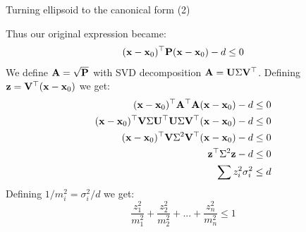 \documentclass{beamer}
\begin{document}
\begin{frame}{Turning ellipsoid to the canonical form (2)}
	\begin{flushleft}
		
		Thus our original expression became:
		\begin{align}
			(\mathbf{x} - \mathbf{x}_0)^\top \mathbf{P}(\mathbf{x} - \mathbf{x}_0) - d \leq 0
		\end{align}
		We define $\mathbf{A} = \sqrt{\mathbf{P}}$ with SVD decomposition $\mathbf{A} = \mathbf{U} \Sigma \mathbf{V}^\top$. Defining $\mathbf{z} = \mathbf{V}^\top (\mathbf{x} - \mathbf{x}_0)$ we get:
		\begin{align}
			(\mathbf{x} - \mathbf{x}_0)^\top \mathbf{A}^\top\mathbf{A}(\mathbf{x} - \mathbf{x}_0) - d \leq 0 
			\\
			(\mathbf{x} - \mathbf{x}_0)^\top  \mathbf{V} \Sigma \mathbf{U}^\top  \mathbf{U} \Sigma \mathbf{V}^\top(\mathbf{x} - \mathbf{x}_0) - d \leq 0 
			\\
			(\mathbf{x} - \mathbf{x}_0)^\top  \mathbf{V} \Sigma^2 \mathbf{V}^\top(\mathbf{x} - \mathbf{x}_0) - d \leq 0
			\\
			\mathbf{z}^\top   \Sigma^2 \mathbf{z} - d \leq 0
			\\
			\sum z_i^2 \sigma_i^2  \leq d
		\end{align}
		Defining $1/m_i^2 = \sigma_i^2 / d$ we get:
		\begin{equation}
			\frac{z_1^2}{m_1^2} + \frac{z_2^2}{m_2^2} + ... + 
			\frac{z_n^2}{m_n^2} \leq 1
		\end{equation}
		
		
	\end{flushleft}
\end{frame}
\end{document}
